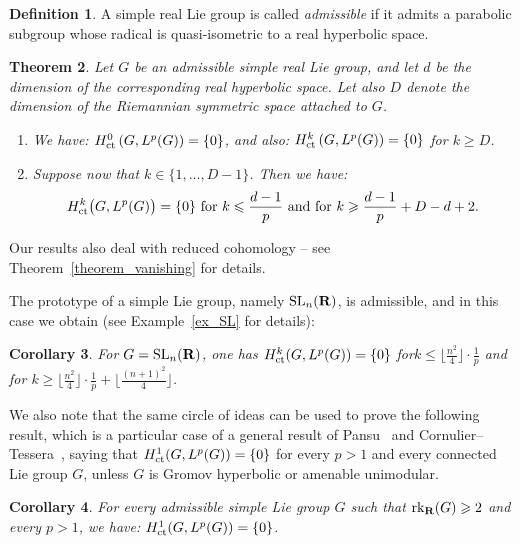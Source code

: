 \documentclass[11pt]{article}
\newtheorem{theo}{Theorem}[section]
\newtheorem{coro}[theo]{Corollary}
\theoremstyle{definition}
\newtheorem{defi}[theo]{Definition}
\numberwithin{equation}{section}
\numberwithin{figure}{section}
\numberwithin{table}{section}
\DeclareMathOperator{\ct}{ct}
\DeclareMathOperator{\rk}{rk}
\DeclareMathOperator{\SL}{SL}
\begin{document}
\begin{defi}\label{intro-def}
A simple real Lie group is called \emph{admissible} if it admits a parabolic subgroup whose radical is quasi-isometric to a real hyperbolic space.
\end{defi}

\begin{theo}\label{intro-thm2}
Let $G$ be an admissible simple real Lie group, and let $d$ be the dimension of the corresponding real hyperbolic space. Let also $D$ denote the dimension of the Riemannian symmetric space attached to $G$.
\begin{enumerate}
\item We have: ${\rm H}^0 _{\ct}\left(G, L^p(G) \right) = \{0\}$, and also: ${\rm H}^k _{\ct}\left(G, L^p(G) \right) = \{0\}$ for $k \geqslant D$.
\item Suppose now that $k \in \{1,\dots,D-1\}$. Then we have:
\[
{\rm H}^k _{\ct}\bigl(G, L^p(G) \bigr) = \{0\} \,\, \text{for} \,\, k \leqslant \frac{d-1}{p} \,\, \text{and for} \,\, k \geqslant \frac{d-1}{p} + D-d+2.
\]
\end{enumerate}
\end{theo}

Our results also deal with reduced cohomology -- see Theorem~\ref{theorem_vanishing} for details.


The prototype of a simple Lie group, namely $\SL_n({\bf R})$, is admissible, and in this case we obtain (see Example~\ref{ex_SL} for details):

\begin{coro}\label{intro_cor1}
For $G = \SL_n({\bf R})$, one has ${\rm H}^k _{\ct} (G, L^p(G)) = \{0\}$ for\linebreak $k \leqslant \lfloor \frac{n^2}{4}\rfloor \cdot\frac{1}{p}$ and for $k \geqslant \lfloor \frac{n^2}{4}\rfloor \cdot\frac{1}{p} + \lfloor \frac{(n+1)^2}{4}\rfloor $.
\end{coro}

We also note that the same circle of ideas can be used to prove the following result, which is a particular case of a general result of Pansu~\cite{P2} and Cornulier--Tessera~\cite{CT}, saying that ${\rm H}^1_{\ct} (G, L^p(G)) = \{0\}$ for every $p>1$ and every connected Lie group $G$, unless $G$ is Gromov hyperbolic or amenable unimodular.


\begin{coro}\label{intro_cor2}
For every admissible simple Lie group $G$ such that $\rk_{\bf R} (G) \linebreak\geqslant 2$ and every $p >1$, we have: ${\rm H}^1 _{\ct}(G, L^p(G)) = \{0\}$.
\end{coro}
\end{document}
